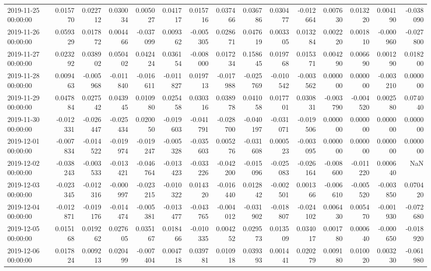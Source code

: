 \begin{tabular}{lrrrrrrrrrrrrrr}
2019-11-25 00:00:00 & 0.015770 & 0.022712 & 0.030034 & 0.005027 & 0.041717 & 0.015716 & 0.037466 & 0.036786 & 0.030477 & -0.012664 & 0.007630 & 0.013220 & 0.004190 & -0.038090 \\
2019-11-26 00:00:00 & 0.059329 & 0.017872 & 0.004466 & -0.037099 & 0.009362 & -0.005305 & 0.028671 & 0.047619 & 0.003305 & 0.013284 & 0.002220 & 0.001810 & -0.000960 & -0.027800 \\
2019-11-27 00:00:00 & 0.023292 & 0.038902 & 0.050402 & 0.042424 & 0.036154 & -0.008000 & 0.017234 & 0.158645 & 0.019768 & 0.015371 & 0.004290 & 0.006690 & 0.001290 & 0.018200 \\
2019-11-28 00:00:00 & 0.009463 & -0.005968 & -0.011840 & -0.016611 & -0.011827 & 0.019713 & -0.017988 & -0.025769 & -0.010542 & -0.003562 & 0.000000 & 0.000000 & -0.003210 & 0.000000 \\
2019-11-29 00:00:00 & 0.047884 & 0.027542 & 0.043945 & 0.010980 & 0.025458 & 0.030316 & 0.038978 & 0.041058 & 0.017701 & 0.030831 & -0.003790 & -0.004520 & 0.002580 & 0.074040 \\
2019-11-30 00:00:00 & -0.012331 & -0.026447 & -0.025434 & 0.020050 & -0.019603 & -0.041791 & -0.028700 & -0.040197 & -0.031071 & -0.019506 & 0.000000 & 0.000000 & 0.000000 & 0.000000 \\
2019-12-01 00:00:00 & -0.007834 & -0.014522 & -0.019974 & -0.019247 & -0.005328 & -0.035603 & 0.005276 & -0.031608 & 0.000523 & -0.003095 & 0.000000 & 0.000000 & 0.000000 & 0.000000 \\
2019-12-02 00:00:00 & -0.038243 & -0.003533 & -0.013421 & -0.046764 & -0.013423 & -0.033226 & -0.042200 & -0.015096 & -0.025083 & -0.026164 & -0.008600 & -0.011220 & 0.000640 & NaN \\
2019-12-03 00:00:00 & -0.023345 & -0.012316 & -0.000997 & -0.023215 & -0.010322 & 0.014320 & -0.016440 & 0.012842 & -0.002501 & 0.001366 & -0.006610 & -0.005520 & -0.003850 & 0.070420 \\
2019-12-04 00:00:00 & -0.012871 & -0.019176 & -0.014474 & -0.005381 & -0.013477 & -0.043765 & -0.004012 & -0.031902 & -0.018807 & -0.024102 & 0.006430 & 0.005470 & -0.001930 & -0.072680 \\
2019-12-05 00:00:00 & 0.015168 & 0.019262 & 0.027605 & 0.035167 & 0.018466 & -0.010335 & 0.004252 & 0.029573 & 0.013509 & 0.034017 & 0.001780 & 0.000640 & -0.000650 & -0.018920 \\
2019-12-06 00:00:00 & 0.017824 & 0.009213 & 0.020499 & -0.007404 & 0.004718 & 0.039781 & 0.010918 & 0.039393 & 0.001441 & 0.020279 & 0.009180 & 0.010020 & 0.003230 & -0.061980 \\

\end{tabular}
